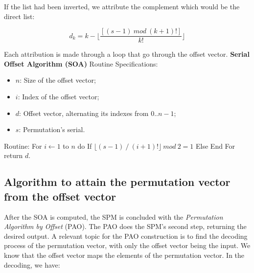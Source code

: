 \documentclass {amsart}
\begin{document}
If the list had been inverted, we attribute the complement which
would be the direct list:

\begin{equation}    \label{eqq}
d_k = k - \displaystyle\biggl\lfloor\frac{[(s-1) ~mod~
(k+1)!]}{k!}\displaystyle\biggl\rfloor
\end{equation}

Each attribution is made through a loop that go through the offset
vector.
\newline\newline
\textbf{Serial Offset Algorithm (SOA)}
\newline
Routine Specifications:
\begin{itemize}
    \item {$n$}: Size of the offset vector;
    \item {$i$}: Index of the offset vector;
    \item {$d$}: Offset vector, alternating its indexes from {$0..n-1$};
    \item {$s$}: Permutation's serial.
\end{itemize}
Routine:
\newline
  \indent For {$i \leftarrow 1$} to {$n$} do \newline
  \indent\indent If {$ \lfloor (s - 1) ~/~ (i+1)! \rfloor ~mod~ 2 = 1$} \newline
  \indent\indent{} \newline
  \indent\indent Else \newline
   \indent \indent{} \newline
   \indent End For \newline \indent
   return {$d$}.
\subsection*{Algorithm to attain the permutation vector from the offset vector}
After the SOA is computed, the SPM is concluded with the
\emph{Permutation Algorithm by Offset} (PAO). The PAO does the
SPM's second step, returning the desired output. A relevant topic
for the PAO construction is to find the decoding process of the
permutation vector, with only the offset vector being the input.
We know that the offset vector maps the elements of the
permutation vector. In the decoding, we have:
\end{document}
